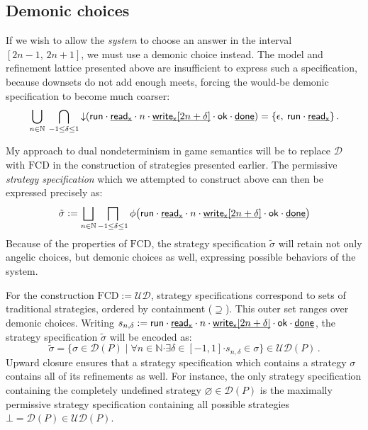 \documentclass[11pt,oneside]{book}
\theoremstyle{definition}
\newcommand{\kw}[1]{\ensuremath{ \mathsf{#1} }}
\newcommand{\bdot}{\boldsymbol{\cdot}}
\newcommand{\ul}[1]{%
  \underline{\smash{#1}}
}
\begin{document}

\subsection{Demonic choices} %

If we wish to allow the \emph{system}
to choose an answer in the interval $[2n - 1, \, 2n + 1]$,
we must use a demonic choice instead.
The model and refinement lattice presented above
are insufficient
to express such a specification,
because downsets do not add enough meets,
forcing the would-be demonic specification to become
much coarser:
\[
    \bigcup_{n \in \mathbb{N}} \:
    \bigcap_{-1 \le \delta \le 1}
    {\downarrow}(
      \kw{run} \cdot
      \ul{\kw{read}_\kw{x}} \cdot n \cdot
      \ul{\kw{write}_\kw{x}[2n + \delta]} \cdot \kw{ok} \cdot
      \ul{\kw{done}}) =
      \{ \epsilon,  \: \kw{run} \cdot \ul{\kw{read}_\kw{x}} \}
    \,.
\]

My approach to dual nondeterminism in game semantics
will be to replace $\mathcal{D}$ with $\mathrm{FCD}$
in the construction of strategies presented earlier. 
The permissive \emph{strategy specification}
which we attempted to construct above
can then be expressed precisely as:
\[
  \tilde{\sigma} :=
    \bigsqcup_{n \in \mathbb{N}}
    \bigsqcap_{-1 \le \delta \le 1}
    \phi \big(
        \kw{run} \cdot
        \ul{\kw{read}_\kw{x}} \cdot n \cdot
        \ul{\kw{write}_\kw{x}[2n + \delta]} \cdot \kw{ok} \cdot
        \ul{\kw{done}} \big)
\]
Because of the properties of $\mathrm{FCD}$,
the strategy specification $\tilde\sigma$ will retain
not only angelic choices,
but demonic choices as well,
expressing possible behaviors
of the system.

For the construction $\mathrm{FCD} := \mathcal{U} \mathcal{D}$,
strategy specifications correspond to
sets of traditional strategies,
ordered by containment ($\supseteq$).
This outer set ranges over demonic choices.
Writing
$
  s_{n,\delta} :=
        \kw{run} \cdot
        \ul{\kw{read}_\kw{x}} \cdot n \cdot
        \ul{\kw{write}_\kw{x}[2n + \delta]} \cdot \kw{ok} \cdot
        \ul{\kw{done}} %
$,
the strategy specification $\tilde{\sigma}$
will be encoded as:
\[
  \tilde{\sigma} =
  \{ \sigma \in \mathcal{D}(P) \mid
     \forall n \in \mathbb{N} \bdot
     \exists \delta \in [-1,1] \bdot
     s_{n,\delta} \in \sigma \}
  \in \mathcal{UD}(P)
  \,.
\]
Upward closure ensures that a strategy specification
which contains a strategy $\sigma$
contains all of its refinements as well.
For instance,
the only strategy specification
containing the completely undefined strategy
$\varnothing \in \mathcal{D}(P)$
is the maximally permissive strategy specification
containing all possible strategies
$\bot = \mathcal{D}(P) \in \mathcal{UD}(P)$.
\end{document}
